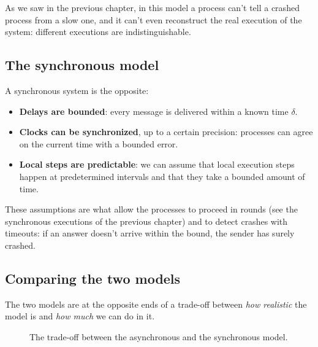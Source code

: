 As we saw in the previous chapter, in this model a process can't tell a crashed process from a slow one, and it can't even reconstruct the real execution of the system: different executions are indistinguishable.

\subsection{The synchronous model}

A synchronous system is the opposite:
\begin{itemize}
  \item \textbf{Delays are bounded}: every message is delivered within a known time $\delta$.
  \item \textbf{Clocks can be synchronized}, up to a certain precision: processes can agree on the current time with a bounded error.
  \item \textbf{Local steps are predictable}: we can assume that local execution steps happen at predetermined intervals and that they take a bounded amount of time.
\end{itemize}

These assumptions are what allow the processes to proceed in rounds (see the synchronous executions of the previous chapter) and to detect crashes with timeouts: if an answer doesn't arrive within the bound, the sender has surely crashed.

\subsection{Comparing the two models}

The two models are at the opposite ends of a trade-off between \textit{how realistic} the model is and \textit{how much} we can do in it.

\begin{figure}[H]
  \centering
  \caption{The trade-off between the asynchronous and the synchronous model.}
  \label{fig:async-vs-sync}
\end{figure}

